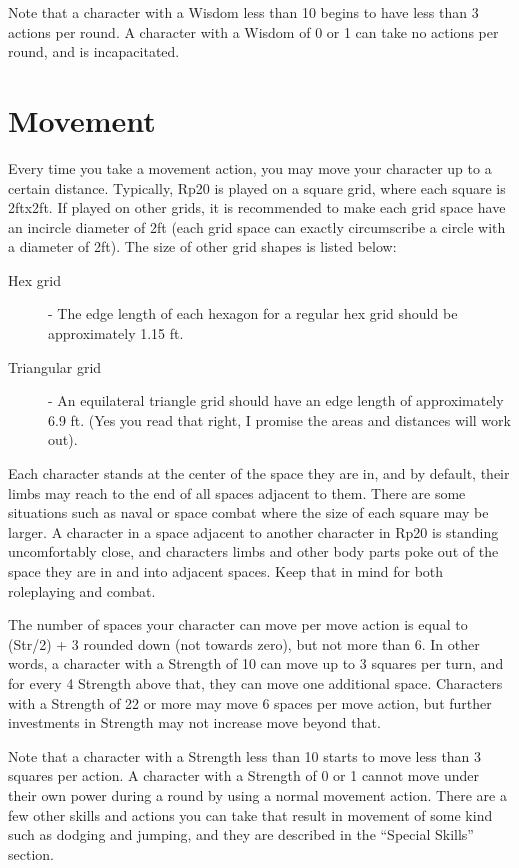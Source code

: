 Note that a character with a Wisdom less than 10 begins to have less than 3 actions per round. A character with a Wisdom of 0 or 1 can take no actions per round, and is incapacitated.

\section{Movement}
Every time you take a movement action, you may move your character up to a certain distance. Typically, Rp20 is played on a square grid, where each square is 2ftx2ft. If played on other grids, it is recommended to make each grid space have an incircle diameter of 2ft (each grid space can exactly circumscribe a circle with a diameter of 2ft). The size of other grid shapes is listed below:
\begin{description}
\item[Hex grid] - The edge length of each hexagon for a regular hex grid should be approximately 1.15 ft.
\item[Triangular grid] - An equilateral triangle grid should have an edge length of approximately 6.9 ft. (Yes you read that right, I promise the areas and distances will work out).
\end{description}
Each character stands at the center of the space they are in, and by default, their limbs may reach to the end of all spaces adjacent to them. There are some situations such as naval or space combat where the size of each square may be larger. A character in a space adjacent to another character in Rp20 is standing uncomfortably close, and characters limbs and other body parts poke out of the space they are in and into adjacent spaces. Keep that in mind for both roleplaying and combat.

The number of spaces your character can move per move action is equal to (Str/2) + 3 rounded down (not towards zero), but not more than 6. In other words, a character with a Strength of 10 can move up to 3 squares per turn, and for every 4 Strength above that, they can move one additional space. Characters with a Strength of 22 or more may move 6 spaces per move action, but further investments in Strength may not increase move beyond that.

Note that a character with a Strength less than 10 starts to move less than 3 squares per action. A character with a Strength of 0 or 1 cannot move under their own power during a round by using a normal movement action.
There are a few other skills and actions you can take that result in movement of some kind such as dodging and jumping, and they are described in the ``Special Skills'' section.

